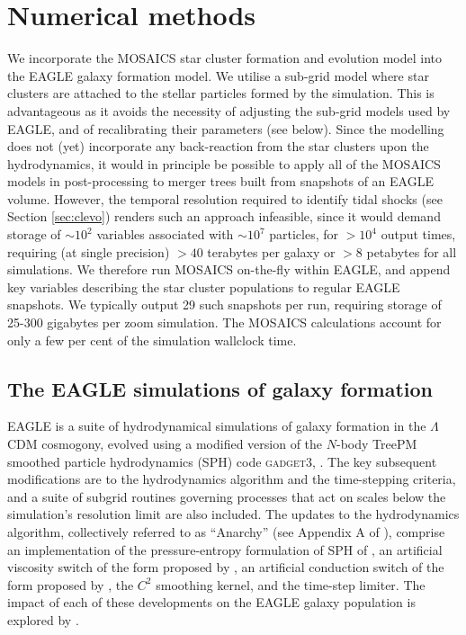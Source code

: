 \documentclass[fleqn,usenatbib]{mnras}
\newcommand{\gadget}         {\textsc{gadget3}}
\begin{document}

\section{Numerical methods} \label{sec:methods}

We incorporate the MOSAICS star cluster formation and evolution model into the EAGLE galaxy formation model. We utilise a sub-grid model where star clusters are attached to the stellar particles formed by the simulation. This is advantageous as it avoids the necessity of adjusting the sub-grid models used by EAGLE, and of recalibrating their parameters (see below). Since the modelling does not (yet) incorporate any back-reaction from the star clusters upon the hydrodynamics, it would in principle be possible to apply all of the MOSAICS models in post-processing to merger trees built from snapshots of an EAGLE volume. However, the temporal resolution required to identify tidal shocks (see Section \ref{sec:clevo}) renders such an approach infeasible, since it would demand storage of $\sim 10^2$ variables associated with $\sim 10^7$ particles, for $>10^4$ output times, requiring (at single precision) $>40$ terabytes per galaxy or $>8$ petabytes for all simulations. We therefore run MOSAICS on-the-fly within EAGLE, and append key variables describing the star cluster populations to regular EAGLE snapshots. We typically output 29 such snapshots per run, requiring storage of 25-300 gigabytes per zoom simulation. The MOSAICS calculations account for only a few per cent of the simulation wallclock time.


\subsection{The EAGLE simulations of galaxy formation}
\label{sec:eagle}

EAGLE \citep[Evolution and Assembly of GaLaxies and their Environments][]{S15, C15} is a suite of hydrodynamical simulations of galaxy formation in the $\Lambda$CDM cosmogony, evolved using a modified version of the $N$-body TreePM smoothed particle hydrodynamics (SPH) code \gadget, \citep[last described by][]{Springel_05}. The key subsequent modifications are to the hydrodynamics algorithm and the time-stepping criteria, and a suite of subgrid routines governing processes that act on scales below the simulation's resolution limit are also included. The updates to the hydrodynamics algorithm, collectively referred to as ``Anarchy'' (see Appendix A of ), comprise an implementation of the pressure-entropy formulation of SPH of \citet{Hopkins_13}, an artificial viscosity switch of the form proposed by \citet{Cullen_and_Dehnen_10}, an artificial conduction switch of the form proposed by \citet{Price_08}, the \citet{Wendland_95} $C^2$ smoothing kernel, and the \citet{Durier_and_Dalla_Vecchia_12} time-step limiter. The impact of each of these developments on the EAGLE galaxy population is explored by \citet{Schaller_et_al_15b_short}.
\end{document}
